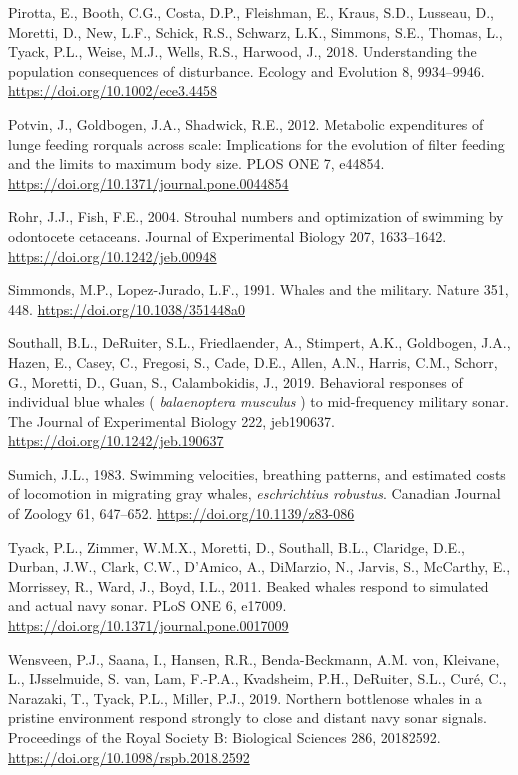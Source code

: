 \documentclass[]{elsarticle} %
\begin{document}
\hypertarget{ref-pirotta_understanding_2018}{}
Pirotta, E., Booth, C.G., Costa, D.P., Fleishman, E., Kraus, S.D.,
Lusseau, D., Moretti, D., New, L.F., Schick, R.S., Schwarz, L.K.,
Simmons, S.E., Thomas, L., Tyack, P.L., Weise, M.J., Wells, R.S.,
Harwood, J., 2018. Understanding the population consequences of
disturbance. Ecology and Evolution 8, 9934--9946.
\url{https://doi.org/10.1002/ece3.4458}

\hypertarget{ref-potvin_metabolic_2012}{}
Potvin, J., Goldbogen, J.A., Shadwick, R.E., 2012. Metabolic
expenditures of lunge feeding rorquals across scale: Implications for
the evolution of filter feeding and the limits to maximum body size.
PLOS ONE 7, e44854. \url{https://doi.org/10.1371/journal.pone.0044854}

\hypertarget{ref-rohr_strouhal_2004}{}
Rohr, J.J., Fish, F.E., 2004. Strouhal numbers and optimization of
swimming by odontocete cetaceans. Journal of Experimental Biology 207,
1633--1642. \url{https://doi.org/10.1242/jeb.00948}

\hypertarget{ref-simmonds_whales_1991}{}
Simmonds, M.P., Lopez-Jurado, L.F., 1991. Whales and the military.
Nature 351, 448. \url{https://doi.org/10.1038/351448a0}

\hypertarget{ref-southall_behavioral_2019}{}
Southall, B.L., DeRuiter, S.L., Friedlaender, A., Stimpert, A.K.,
Goldbogen, J.A., Hazen, E., Casey, C., Fregosi, S., Cade, D.E., Allen,
A.N., Harris, C.M., Schorr, G., Moretti, D., Guan, S., Calambokidis, J.,
2019. Behavioral responses of individual blue whales (
\emph{balaenoptera musculus} ) to mid-frequency military sonar. The
Journal of Experimental Biology 222, jeb190637.
\url{https://doi.org/10.1242/jeb.190637}

\hypertarget{ref-sumich_swimming_1983}{}
Sumich, J.L., 1983. Swimming velocities, breathing patterns, and
estimated costs of locomotion in migrating gray whales,
\emph{eschrichtius robustus}. Canadian Journal of Zoology 61, 647--652.
\url{https://doi.org/10.1139/z83-086}

\hypertarget{ref-tyack_beaked_2011}{}
Tyack, P.L., Zimmer, W.M.X., Moretti, D., Southall, B.L., Claridge,
D.E., Durban, J.W., Clark, C.W., D'Amico, A., DiMarzio, N., Jarvis, S.,
McCarthy, E., Morrissey, R., Ward, J., Boyd, I.L., 2011. Beaked whales
respond to simulated and actual navy sonar. PLoS ONE 6, e17009.
\url{https://doi.org/10.1371/journal.pone.0017009}

\hypertarget{ref-wensveen_northern_2019}{}
Wensveen, P.J., Saana, I., Hansen, R.R., Benda-Beckmann, A.M. von,
Kleivane, L., IJsselmuide, S. van, Lam, F.-P.A., Kvadsheim, P.H.,
DeRuiter, S.L., Curé, C., Narazaki, T., Tyack, P.L., Miller, P.J., 2019.
Northern bottlenose whales in a pristine environment respond strongly to
close and distant navy sonar signals. Proceedings of the Royal Society
B: Biological Sciences 286, 20182592.
\url{https://doi.org/10.1098/rspb.2018.2592}
\end{document}
